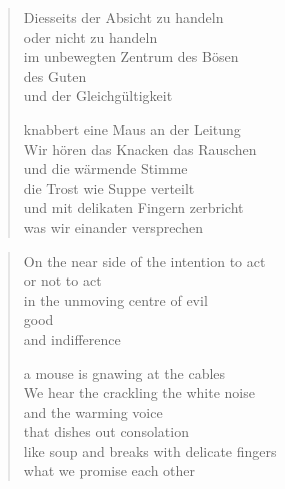 
\cleartoverso


\begin{verse}

Diesseits der Absicht zu handeln\\
oder nicht zu handeln\\
im unbewegten Zentrum des Bösen\\
des Guten\\
und der Gleichgültigkeit

knabbert eine Maus an der Leitung\\
Wir hören das Knacken das Rauschen\\
und die wärmende Stimme\\
die Trost wie Suppe verteilt\\
und mit delikaten Fingern zerbricht\\
was wir einander versprechen

\end{verse}

\clearpage


\begin{verse}

On the near side of the intention to act\\
or not to act\\
in the unmoving centre of evil\\
good\\
and indifference

a mouse is gnawing at the cables\\
We hear the crackling the white noise\\
and the warming voice\\
that dishes out consolation\\
like soup and breaks with delicate fingers\\
what we promise each other

\end{verse}
